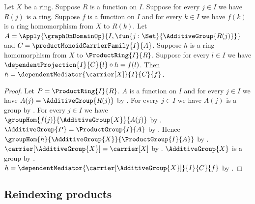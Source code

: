 \begin{theorem}\label{product_ring_mediator_unique}
    Let $X$ be a ring.
    Suppose $R$ is a function on $I$.
    Suppose for every $j\in I$ we have $R(j)$ is a ring.
    Suppose $f$ is a function on $I$ and for every $k\in I$ we have
        $f(k)$ is a ring homomorphism from $X$ to $R(k)$.
    Let
        $A=\Apply{\graphOnDomainOp}{
            I,\fun{j:\Set}{\AdditiveGroup{R(j)}}}$ and
        $C=\productMonoidCarrierFamily{I}{A}$.
    Suppose $h$ is a ring homomorphism from $X$ to
        $\ProductRing{I}{R}$.
    Suppose for every $l\in I$ we have
        $\dependentProjection{I}{C}{l}\circ h=f(l)$.
    Then $h=\dependentMediator{\carrier[X]}{I}{C}{f}$.
\end{theorem}
\begin{proof}
    Let $P=\ProductRing{I}{R}$.
    $A$ is a function on $I$ and for every $j\in I$ we have
        $A(j)=\AdditiveGroup{R(j)}$ by
        .
    For every $j\in I$ we have $A(j)$ is a group by
        .
    For every $j\in I$ we have
        $\groupHom{f(j)}{\AdditiveGroup{X}}{A(j)}$ by
        .
    $\AdditiveGroup{P}=\ProductGroup{I}{A}$ by
        .
    Hence $\groupHom{h}{\AdditiveGroup{X}}{\ProductGroup{I}{A}}$ by
        .
    $\carrier[\AdditiveGroup{X}]=\carrier[X]$ by
        .
    $\AdditiveGroup{X}$ is a group by
        .
    $h=\dependentMediator{\carrier[\AdditiveGroup{X}]}{I}{C}{f}$ by
        .
\end{proof}

\subsection{Reindexing products}

